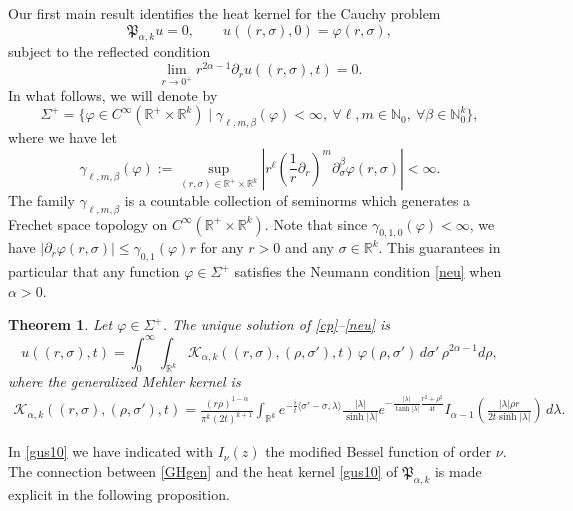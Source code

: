 \documentclass[11pt,a4paper]{amsart}
\def \R {\mathbb{R}}
\def \vf{\varphi}
\newcommand{\p}{\partial}
\numberwithin{equation}{section}
\newtheorem{theorem}{Theorem}[section]
\numberwithin{equation}{section}
\begin{document}
Our first main result identifies the heat kernel for the Cauchy problem
\begin{equation}\label{cp}
\mathfrak P_{\alpha,k} u = 0,
\qquad
u((r,\sigma),0)=\varphi(r,\sigma),
\end{equation}
subject to the reflected condition
\begin{equation}\label{neu}
\lim_{r\to 0^+} r^{2\alpha-1}\partial_r u((r,\sigma),t)=0.
\end{equation}
In what follows, we will denote by 
\[
\Sigma^+= \{\vf \in C^\infty(\R^+\times \R^k)\mid \gamma_{\ell,m,\beta}(\vf)<\infty,\  \forall \ell, m\in \mathbb N_0,\ \forall \beta\in \mathbb N_0^k\},
\]
where we have let
\[
\gamma_{\ell,m,\beta}(\vf) :=  \underset{(r,\sigma)\in \R^+\times\R^k}{\sup} \left|r^\ell \left(\frac 1r \p_r\right)^m\p^\beta_\sigma \vf(r,\sigma)\right| < \infty.
\]
The family $\gamma_{\ell,m,\beta}$ is a countable collection of seminorms which generates a Frechet space topology on $C^\infty(\R^+\times \R^k)$. Note that since $\gamma_{0,1,0}(\vf)<\infty$, we have $|\p_r \vf(r,\sigma)|\le \gamma_{0,1}(\vf) r$ for any $r>0$ and any $\sigma\in \R^k$.  This guarantees in particular that any function $\vf\in \Sigma^+$ satisfies the Neumann condition \eqref{neu} when $\alpha>0$. 

\begin{theorem}\label{T:gengus}
Let $\varphi\in \Sigma^+$. The unique solution of
\eqref{cp}–\eqref{neu} is
\[
u((r,\sigma),t)
   = \int_0^\infty\!\int_{\R^k}
   \mathscr K_{\alpha,k}((r,\sigma),(\rho,\sigma'),t)\,
     \varphi(\rho,\sigma')
     \, d\sigma' \,\rho^{2\alpha-1} d\rho,
\]
where the \emph{generalized Mehler kernel} is
\begin{align}\label{gus10}
\mathscr K_{\alpha,k}((r,\sigma),(\rho,\sigma'),t)
  = \frac{(r\rho)^{1-\alpha}}{\pi^k (2t)^{k+1}}
    \int_{\R^k} e^{-\frac{i}{t}\langle \sigma'-\sigma,\lambda\rangle}
      \frac{|\lambda|}{\sinh |\lambda|}
      e^{-\frac{|\lambda|}{\tanh |\lambda|}
         \frac{r^2+\rho^2}{4t}}
      I_{\alpha-1}\!\left(
        \frac{|\lambda|\rho r}{2t\sinh |\lambda|}
      \right)
      \, d\lambda.
\end{align}
\end{theorem}

In \eqref{gus10} we have indicated with $I_\nu(z)$ the modified Bessel function of order $\nu$. The connection between \eqref{GHgen} and the heat kernel \eqref{gus10} of $\mathfrak P_{\alpha,k}$ is made explicit in the following proposition.
\end{document}
